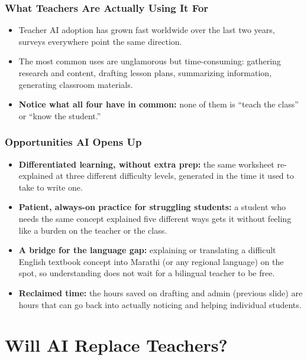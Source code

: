 \begin{frame}[fragile]\frametitle{What Teachers Are Actually Using It For}
\begin{itemize}
\item Teacher AI adoption has grown fast worldwide over the last two years, surveys everywhere point the same direction.
\item The most common uses are unglamorous but time-consuming: gathering research and content, drafting lesson plans, summarizing information, generating classroom materials.
\item \textbf{Notice what all four have in common:} none of them is ``teach the class'' or ``know the student.''
\end{itemize}
\end{frame}

\begin{frame}[fragile]\frametitle{Opportunities AI Opens Up}
\begin{itemize}
\item \textbf{Differentiated learning, without extra prep:} the same worksheet re-explained at three different difficulty levels, generated in the time it used to take to write one.
\item \textbf{Patient, always-on practice for struggling students:} a student who needs the same concept explained five different ways gets it without feeling like a burden on the teacher or the class.
\item \textbf{A bridge for the language gap:} explaining or translating a difficult English textbook concept into Marathi (or any regional language) on the spot, so understanding does not wait for a bilingual teacher to be free.
\item \textbf{Reclaimed time:} the hours saved on drafting and admin (previous slide) are hours that can go back into actually noticing and helping individual students.
\end{itemize}
\end{frame}

\section[TaskvJob]{Will AI Replace Teachers?}


